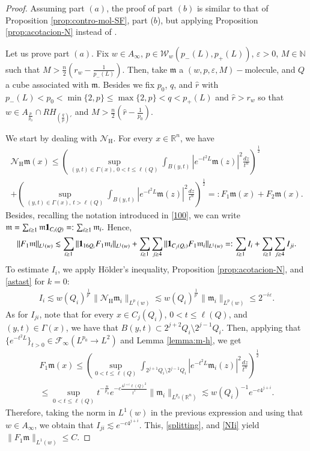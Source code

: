 \documentclass[11pt, a4paper,leqno]{amsart}
\newcommand{\mm}{\mathfrak{m}}
\renewcommand{\chi}{{\bf 1}}
\theoremstyle{plain}
\theoremstyle{definition}
\theoremstyle{remark}
\numberwithin{equation}{section}
\def \R{ \mathbb{R} }
\def \N{ \mathbb{N} }
\def \hh{ \mathrm{H} }
\def \Ncal { \mathcal{N} }
\def \mol{ (w,p,\varepsilon,M)-\textrm{molecule}}
\begin{document}
\begin{proof}
Assuming part $(a)$, the proof of part $(b)$ is similar to that of Proposition \ref{prop:contro-mol-SF}, part ($b$), but applying Proposition \ref{prop:acotacion-N} instead of \cite[Theorems 1.12 and 1.13]{MartellPrisuelos}.




Let us prove part $(a)$. Fix $w\in A_{\infty}$, $p\in \mathcal{W}_w(p_-(L),p_+(L))$, $\varepsilon>0$, $M\in \N$ such that $M>\frac{n}{2}\left(r_w-\frac{1}{p_-(L)}\right)$. Then, take  $\mm$ a $\mol$, and $Q$ a cube associated with $\mm$. Besides we fix $p_0$, $q$, and $\widehat{r}$ with $p_-(L)<p_0<\min\{2,p\}\leq \max\{2,p\}<q<p_+(L)$ and $\widehat{r}>r_w$ so that $w\in A_{\frac{p}{p_0}}\cap RH_{\left(\frac{q}{p}\right)'}$ and 
$M>\frac{n}{2}\left(\widehat{r}-\frac{1}{p_0}\right)$.


We start by dealing with $\Ncal_{\hh}$.
For every $x\in \R^n$, we have
\begin{multline*}
\Ncal_{\hh}\mm(x)\leq \left(\sup_{(y,t)\in \Gamma(x),\, 0<t\leq \ell(Q)}\int_{B(y,t)}
|e^{-t^2L}\mm(z)|^2\frac{dz}{t^n}\right)^{\frac{1}{2}}
\\
+\left(\sup_{(y,t)\in \Gamma(x),\,t>\ell(Q)}\int_{B(y,t)}
|e^{-t^2L}\mm(z)|^2\frac{dz}{t^n}\right)^{\frac{1}{2}}=:F_1\mm(x)+F_2\mm(x).
\end{multline*}
Besides, recalling the notation introduced in \eqref{100}, we can write $\mm=\sum_{i\geq 1}\mm\chi_{C_i(Q)}=:\sum_{i\geq 1}\mm_i.$
Hence,
    \begin{align}\label{splitting}
   \|F_1\mm\|_{L^1(w)}\lesssim
 \sum_{i\geq 1}\|\chi_{16Q_i}F_1\mm_i\|_{L^1(w)}
  +
 \sum_{i\geq 1}  \sum_{j\geq 4}
    \|\chi_{C_j(Q_i)}F_1\mm_i\|_{L^1(w)}
=:\sum_{i\geq 1}I_i+\sum_{i\geq 1}\sum_{j\geq
4}I_{ji}.
    \end{align}
  To estimate $I_i$, we apply H\"older's inequality,   
 Proposition \ref{prop:acotacion-N}, and \eqref{astast} for $k=0$:
\begin{align}\label{NIi}
I_{i}
\lesssim w(Q_i)^{\frac{1}{p'}}\|\Ncal_{\hh}\mm_i\|_{L^p(w)}\lesssim w(Q_i)^{\frac{1}{p'}}\|\mm_i\|_{L^p(w)}\leq 2^{-i\varepsilon}.
\end{align}
As for $I_{ji}$, note that for every $x\in C_{j}(Q_i)$,  
$0<t\leq\ell(Q)$, and $(y,t)\in \Gamma(x)$, we have that
$
B(y,t)\subset 2^{j+2}Q_i\setminus 2^{j-1}Q_i.
$
Then, applying that $\{e^{-t^2L}\}_{t>0}\in \mathcal{F}_{\infty}(L^{p_0}\rightarrow L^2)$ and Lemma \ref{lemma:m-h}, we get
 \begin{multline*}
    F_1	\mm(x)
    \leq
    \left(\sup_{0<t\leq \ell(Q)}\int_{2^{j+1}Q_i\setminus 2^{j-1}Q_i}
|e^{-t^2L}\mm_i(z)|^2\frac{dz}{t^n}\right)^{\frac{1}{2}}
\\
\leq
    \sup_{0<t\leq\ell(Q)}t^{-\frac{n}{p_0}}
    e^{-c\frac{4^{j+i}\ell(Q)^2}{t^2}}\|\mm_i\|_{L^{p_0}(\mathbb{R}^n)}
  \lesssim
  w(Q_i)^{-1}e^{-c4^{j+i}}.
  \end{multline*}
 Therefore, taking the norm in $L^1(w)$ in the previous expression and using that $w\in A_{\infty}$, we obtain that
$ I_{ji}
\lesssim e^{-c4^{j+i}}.
$
This, \eqref{splitting}, and \eqref{NIi} yield
    $
\|F_1\mm\|_{L^1(w)}
\leq C.
   $
   

\end{proof}
\end{document}
